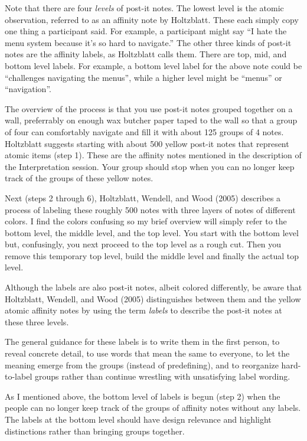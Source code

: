 Note that there are four \emph{levels} of post-it notes. The lowest
level is the atomic observation, referred to as an affinity note by
Holtzblatt. These each simply copy one thing a participant said. For
example, a participant might say ``I hate the menu system because it's
so hard to navigate.'' The other three kinds of post-it notes are the
affinity labels, as Holtzblatt calls them. There are top, mid, and
bottom level labels. For example, a bottom level label for the above
note could be ``challenges navigating the menus'', while a higher level
might be ``menus'' or ``navigation''.

The overview of the process is that you use post-it notes grouped
together on a wall, preferrably on enough wax butcher paper taped to the
wall so that a group of four can comfortably navigate and fill it with
about 125 groups of 4 notes. Holtzblatt suggests starting with about 500
yellow post-it notes that represent atomic items (step 1). These are the
affinity notes mentioned in the description of the Interpretation
session. Your group should stop when you can no longer keep track of the
groups of these yellow notes.

Next (steps 2 through 6), Holtzblatt, Wendell, and Wood (2005) describes
a process of labeling these roughly 500 notes with three layers of notes
of different colors. I find the colors confusing so my brief overview
will simply refer to the bottom level, the middle level, and the top
level. You start with the bottom level but, confusingly, you next
proceed to the top level as a rough cut. Then you remove this temporary
top level, build the middle level and finally the actual top level.

Although the labels are also post-it notes, albeit colored differently,
be aware that Holtzblatt, Wendell, and Wood (2005) distinguishes between
them and the yellow atomic affinity notes by using the term
\emph{labels} to describe the post-it notes at these three levels.

The general guidance for these labels is to write them in the first
person, to reveal concrete detail, to use words that mean the same to
everyone, to let the meaning emerge from the groups (instead of
predefining), and to reorganize hard-to-label groups rather than
continue wrestling with unsatisfying label wording.

As I mentioned above, the bottom level of labels is begun (step 2) when
the people can no longer keep track of the groups of affinity notes
without any labels. The labels at the bottom level should have design
relevance and highlight distinctions rather than bringing groups
together.

